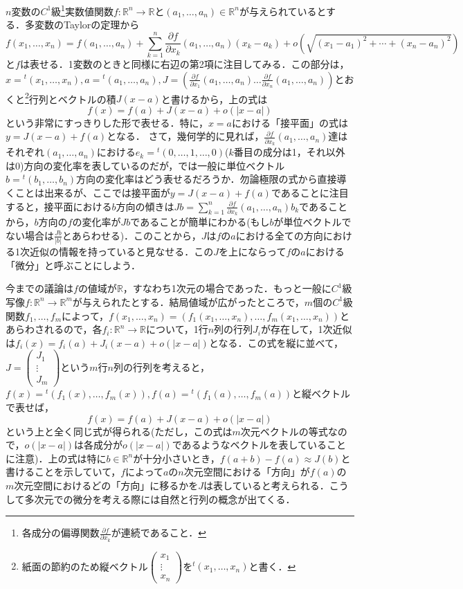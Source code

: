 \documentclass{jsarticle}
\def\vecb{\begin{pmatrix}}
\def\vece{\end{pmatrix}}
\def\realnum{{\mathbb R}}
\def\dfrac{\displaystyle\frac}
\def\dsum{\displaystyle\sum}
\def\tenchi{{}^t\!}
\def\delxkf{\dfrac{\partial f}{\partial x_k}}
\def\delxof{\dfrac{\partial f}{\partial x_1}}
\def\delxnf{\dfrac{\partial f}{\partial x_n}}
\def\xvec{(x_1,\dots,x_n)}
\def\avec{(a_1,\dots,a_n)}
\begin{document}
$n$変数の$C^1$級\footnote{各成分の偏導関数$\delxkf$が連続であること．}実数値関数$f:\realnum^n\rightarrow\realnum$と$\avec\in\realnum^n$が与えられているとする．多変数のTaylorの定理から
$$
f\xvec=f\avec+\sum_{k=1}^{n}\delxkf\avec(x_k-a_k)+o(\sqrt{(x_1-a_1)^2+\cdots+(x_n-a_n)^2})
$$
と$f$は表せる．1変数のときと同様に右辺の第2項に注目してみる．この部分は，$x={}^t\!(x_1,\dots,x_n), a={}^t\!(a_1,\dots,a_n), J=(\delxof(a_1,\dots,a_n) \dots \delxnf(a_1,\dots,a_n))$とおくと\footnote{紙面の節約のため縦ベクトル$\vecb x_1 \\ \vdots \\ x_n\vece$を${}^t\!(x_1,\dots,x_n)$と書く．}行列とベクトルの積$J(x-a)$と書けるから，上の式は
$$
f(x)=f(a)+J(x-a)+o(|x-a|)
$$
という非常にすっきりした形で表せる．特に，$x=a$における「接平面」の式は$y=J(x-a)+f(a)$となる．
さて，幾何学的に見れば，$\delxkf(a_1,\dots,a_n)$達はそれぞれ$(a_1,\dots,a_n)$における$e_k=\tenchi(0,\dots,1,\dots,0)$($k$番目の成分は1，それ以外は0)方向の変化率を表しているのだが，では一般に単位ベクトル$b=\tenchi(b_1,\dots,b_n)$方向の変化率はどう表せるだろうか．勿論極限の式から直接導くことは出来るが、ここでは接平面が$y=J(x-a)+f(a)$であることに注目すると，接平面における$b$方向の傾きは$Jb=\dsum_{k=1}^{n}\delxkf(a_1,\dots,a_n)b_k$であることから，$b$方向の$f$の変化率が$Jb$であることが簡単にわかる(もし$b$が単位ベクトルでない場合は$\dfrac{Jb}{|b|}$とあらわせる)．このことから，$J$は$f$の$a$における全ての方向における1次近似の情報を持っていると見なせる．この$J$を上にならって$f$の$a$における「微分」と呼ぶことにしよう．


今までの議論は$f$の値域が$\realnum$，すなわち1次元の場合であった．もっと一般に$C^1$級写像$f:\realnum^n\rightarrow\realnum^m$が与えられたとする．結局値域が広がったところで，$m$個の$C^1$級関数$f_1,\dots,f_m$によって，$f\xvec=(f_1\xvec,\dots,f_m\xvec)$とあらわされるので，各$f_i:\realnum^n\rightarrow\realnum$について，1行$n$列の行列$J_i$が存在して，1次近似は$f_i(x)=f_i(a)+J_i(x-a)+o(|x-a|)$となる．この式を縦に並べて，$J=\vecb J_1\\ \vdots \\J_m\vece$という$m$行$n$列の行列を考えると，$f(x)=\tenchi(f_1(x),\dots,f_m(x)),f(a)=\tenchi(f_1(a),\dots,f_m(a))$と縦ベクトルで表せば，
$$
f(x)=f(a)+J(x-a)+o(|x-a|)
$$
という上と全く同じ式が得られる(ただし，この式は$m$次元ベクトルの等式なので，$o(|x-a|)$は各成分が$o(|x-a|)$であるようなベクトルを表していることに注意)．上の式は特に$b\in\realnum^n$が十分小さいとき，$f(a+b)-f(a)\approx J(b)$と書けることを示していて，$f$によって$a$の$n$次元空間における「方向」が$f(a)$の$m$次元空間におけるどの「方向」に移るかを$J$は表していると考えられる．こうして多次元での微分を考える際には自然と行列の概念が出てくる．
\end{document}
